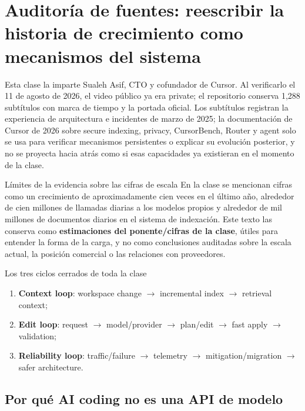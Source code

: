 \documentclass[a4paper]{article}
\begin{document}
\makecscover

\section{Auditoría de fuentes: reescribir la historia de crecimiento como mecanismos del sistema}

Esta clase la imparte Sualeh Asif, CTO y cofundador de Cursor. Al verificarlo el 11 de agosto de 2026, el video público ya era private; el repositorio conserva 1,288 subtítulos con marca de tiempo y la portada oficial. Los subtítulos registran la experiencia de arquitectura e incidentes de marzo de 2025; la documentación de Cursor de 2026 sobre secure indexing, privacy, CursorBench, Router y agent solo se usa para verificar mecanismos persistentes o explicar su evolución posterior, y no se proyecta hacia atrás como si esas capacidades ya existieran en el momento de la clase.

\begin{warningbox}{Límites de la evidencia sobre las cifras de escala}
En la clase se mencionan cifras como un crecimiento de aproximadamente cien veces en el último año, alrededor de cien millones de llamadas diarias a los modelos propios y alrededor de mil millones de documentos diarios en el sistema de indexación. Este texto las conserva como \textbf{estimaciones del ponente/cifras de la clase}, útiles para entender la forma de la carga, y no como conclusiones auditadas sobre la escala actual, la posición comercial o las relaciones con proveedores.
\end{warningbox}

\begin{importantbox}{Los tres ciclos cerrados de toda la clase}
\begin{enumerate}
  \item \textbf{Context loop}: workspace change $\rightarrow$ incremental index $\rightarrow$ retrieval context;
  \item \textbf{Edit loop}: request $\rightarrow$ model/provider $\rightarrow$ plan/edit $\rightarrow$ fast apply $\rightarrow$ validation;
  \item \textbf{Reliability loop}: traffic/failure $\rightarrow$ telemetry $\rightarrow$ mitigation/migration $\rightarrow$ safer architecture.
\end{enumerate}
\end{importantbox}

\subsection{Por qué AI coding no es una API de modelo}
\end{document}
